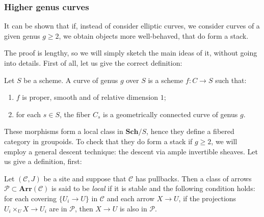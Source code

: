 \begin{refsection}
\subsubsection{Higher genus curves}

It can be shown that if, instead of consider elliptic curves, we consider curves of a given genus $g \ge 2$, we obtain objects more well-behaved, that do form a stack.

The proof is lengthy, so we will simply sketch the main ideas of it, without going into details. First of all, let us give the correct definition:

\begin{defin}
Let $S$ be a scheme. A curve of genus $g$ over $S$ is a scheme $f \colon C \to S$ such that:
\begin{enumerate}
\item $f$ is proper, smooth and of relative dimension $1$;
\item for each $s \in S$, the fiber $C_s$ is a geometrically connected curve of genus $g$.
\end{enumerate}
\end{defin}

These morphisms form a local class in $\mathbf{Sch}/S$, hence they define a fibered category in groupoids. To check that they do form a stack if $g \ge 2$, we will employ a general descent technique: the descent via ample invertible sheaves. Let us give a definition, first:

\begin{defin}
Let $(\mathcal C, J)$ be a site and suppose that $\mathcal C$ has pullbacks. Then a class of arrows $\mathcal P \subset \mathbf{Arr}(\mathcal C)$ is said to be \emph{local} if it is stable and the following condition holds: for each covering $\{U_i \to U\}$ in $\mathcal C$ and each arrow $X \to U$, if the projections $U_i \times_U X \to U_i$ are in $\mathcal P$, then $X \to U$ is also in $\mathcal P$.
\end{defin}


\end{refsection}
